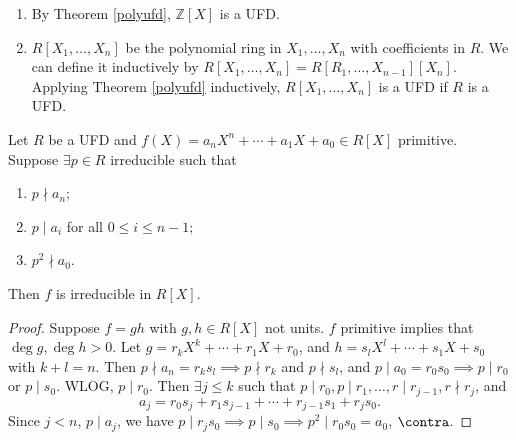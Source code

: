 \begin{example}
    \leavevmode
    \begin{enumerate}
        \item By Theorem \eqref{polyufd}, \(\mathbb{Z}[X]\) is a UFD.
        \item \(R[X_1, \ldots, X_n]\) be the polynomial ring in \(X_1, \ldots, X_n\) with coefficients in \(R\). We can define it inductively by \(R[X_1, \ldots, X_n] = R[R_1, \ldots, X_{n-1}][X_n]\). Applying Theorem \eqref{polyufd} inductively, \(R[X_1, \ldots, X_n]\) is a UFD if \(R\) is a UFD.
    \end{enumerate}
\end{example}
\begin{theorem}
    Let \(R\) be a UFD and \(f(X) = a_n X^n + \cdots + a_1 X + a_0 \in R[X]\) primitive. Suppose \(\exists p \in R\) irreducible such that
    \begin{enumerate}
        \item \(p \nmid a_n\);
        \item \(p \mid a_i\) for all \(0 \leq i \leq n - 1\);
        \item \(p^2 \nmid a_0\).
    \end{enumerate}
    Then \(f\) is irreducible in \(R[X]\).
\end{theorem}
\begin{proof}
    Suppose \(f = gh\) with \(g, h \in R[X]\) not units. \(f\) primitive implies that \(\deg g, \deg h > 0\). Let \(g = r_k X^k + \cdots + r_1 X + r_0\), and \(h = s_l X^l + \cdots + s_1 X + s_0\) with \(k + l = n\). Then \(p \nmid a_n = r_k s_l \implies p \nmid r_k\) and \(p \nmid s_l\), and \(p \mid a_0 = r_0 s_0\implies p \mid r_0\) or \(p \mid s_0\). WLOG, \(p \mid r_0\). Then \(\exists j \leq k\) such that \(p \mid r_0, p \mid r_1, \ldots, r\mid r_{j-1}, r\nmid r_j\), and
    \[
        a_j = r_0 s_j + r_1 s_{j-1} + \cdots + r_{j-1}s_1 + r_j s_0.
    \]
    Since \(j < n\), \(p\mid a_j\), we have \(p \mid r_j s_0 \implies p \mid s_0 \implies p^2 \mid r_0 s_0 = a_0\), \(\contra\).
\end{proof}
